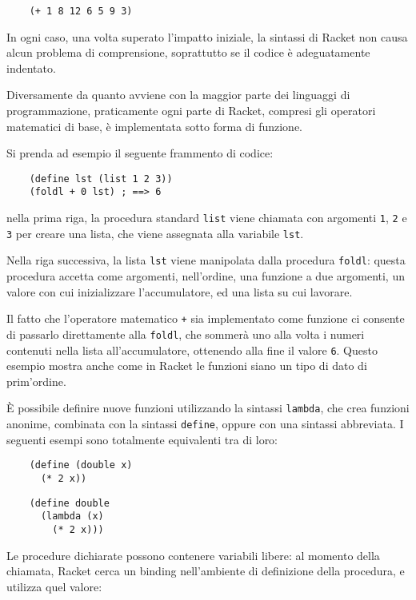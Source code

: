 \begin{lstlisting}
    (+ 1 8 12 6 5 9 3)
\end{lstlisting}

In ogni caso, una volta superato l'impatto iniziale, la sintassi di
Racket non causa alcun problema di comprensione, soprattutto se il
codice \`e adeguatamente indentato.

Diversamente da quanto avviene con la maggior parte dei linguaggi di
programmazione, praticamente ogni parte di Racket, compresi gli operatori
matematici di base, \`e implementata sotto forma di funzione.

Si prenda ad esempio il seguente frammento di codice:

\begin{lstlisting}
    (define lst (list 1 2 3))
    (foldl + 0 lst) ; ==> 6
\end{lstlisting}

nella prima riga, la procedura standard \lstinline{list} viene chiamata
con argomenti \lstinline{1}, \lstinline{2} e \lstinline{3} per creare una
lista, che viene assegnata alla variabile \lstinline{lst}.

Nella riga successiva, la lista \lstinline{lst} viene manipolata dalla
procedura \lstinline{foldl}: questa procedura accetta come argomenti,
nell'ordine, una funzione a due argomenti, un valore con cui
inizializzare l'accumulatore, ed una lista su cui lavorare.

Il fatto che l'operatore matematico \lstinline{+} sia implementato come
funzione ci consente di passarlo direttamente alla \lstinline{foldl}, che
sommer\`a uno alla volta i numeri contenuti nella lista all'accumulatore,
ottenendo alla fine il valore \lstinline{6}. Questo esempio mostra anche
come in Racket le funzioni siano un tipo di dato di prim'ordine.

\`E possibile definire nuove funzioni utilizzando la sintassi
\lstinline{lambda}, che crea funzioni anonime, combinata con la sintassi
\lstinline{define}, oppure con una sintassi abbreviata. I seguenti esempi
sono totalmente equivalenti tra di loro:

\begin{lstlisting}
    (define (double x)
      (* 2 x))
\end{lstlisting}

\begin{lstlisting}
    (define double
      (lambda (x)
        (* 2 x)))
\end{lstlisting}

Le procedure dichiarate possono contenere variabili libere: al momento
della chiamata, Racket cerca un binding nell'ambiente di definizione
della procedura, e utilizza quel valore:

